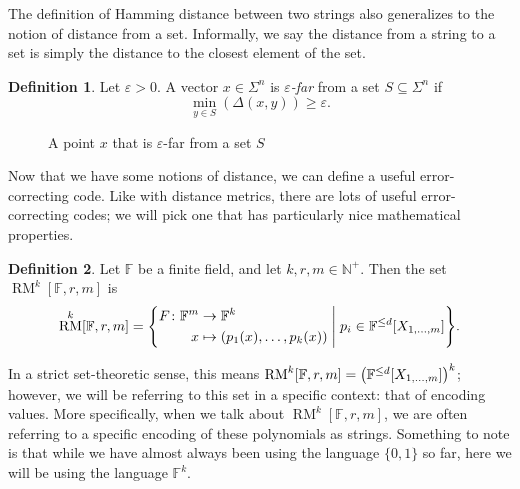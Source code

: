 \documentclass[english,12pt]{reedthesis}
\theoremstyle{plain}
\theoremstyle{definition}
\newtheorem{defn}[defn]{Definition}
\theoremstyle{remark}
\DeclareMathOperator{\RM}{RM}
\newcommand{\middlemid}{%
  \ensuremath{\;\middle\vert\;}
}
\begin{document}
The definition of Hamming distance between two strings also generalizes to the
notion of distance from a set. Informally, we say the distance from a string to
a set is simply the distance to the closest element of the set.

\begin{defn}\label{def:far}
  Let $\varepsilon > 0$. A vector $x \in \Sigma^{n}$ is \emph{$\varepsilon$-far} from a set $S \subseteq \Sigma^{n}$ if
  \[
    \min_{y \in S}(\Delta(x, y)) \ge \varepsilon.
  \]
\end{defn}

\begin{figure}[htbp]
  \centering
  \caption{A point $x$ that is $\varepsilon$-far from a set $S$}\label{fig:epsilon-far}
\end{figure}

Now that we have some notions of distance, we can define a useful
error-correcting code. Like with distance metrics, there are lots of useful
error-correcting codes; we will pick one that has particularly nice mathematical
properties.

\begin{defn}\label{def:rm-set}\index{RM@$\RM$}
  Let $\mathbb{F}$ be a finite field, and let $k, r, m \in \mathbb{N}^{+}$. Then the set
  $\RM^{k}[\mathbb{F}, r, m]$ is
  \begin{equation}
    \RM^{k}[\mathbb{F}, r, m] = \mleft\{
      \begin{aligned}
        F\colon \mathbb{F}^{m} &\rightarrow \mathbb{F}^{k} \\
        x &\mapsto (p_{1}(x), \ldots, p_{k}(x))
      \end{aligned}
      \middlemid
      p_{i} \in \mathbb{F}^{\le d}[X_{1, \ldots, m}]
    \mright\}.
  \end{equation}
\end{defn}

In a strict set-theoretic sense, this means
$\RM^{k}[\mathbb{F}, r, m] = \mleft(\mathbb{F}^{\le d}[X_{1, \ldots, m}]\mright)^{k}$;
however, we will be referring to this set in a specific context: that of
encoding values. More specifically, when we talk about
$\RM^{k}[\mathbb{F}, r, m]$, we are often referring to a specific encoding of
these polynomials as strings. Something to note is that while we have almost
always been using the language $\{0, 1\}$ so far, here we will be using the
language $\mathbb{F}^{k}$.
\end{document}
